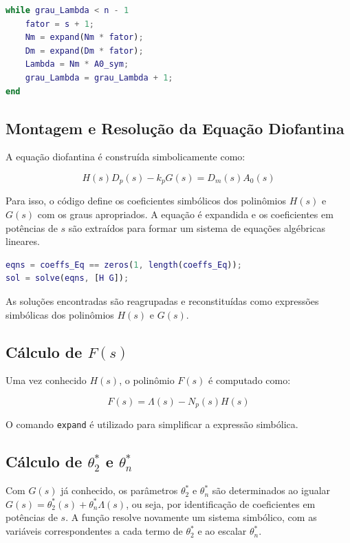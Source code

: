 \documentclass[10pt]{article}
\begin{document}
\begin{lstlisting}[language=Matlab]
while grau_Lambda < n - 1
    fator = s + 1;
    Nm = expand(Nm * fator);
    Dm = expand(Dm * fator);
    Lambda = Nm * A0_sym;
    grau_Lambda = grau_Lambda + 1;
end
\end{lstlisting}

\subsection{Montagem e Resolução da Equação Diofantina}

A equação diofantina é construída simbolicamente como:

\[
H(s) D_p(s) - k_p G(s) = D_m(s) A_0(s)
\]

Para isso, o código define os coeficientes simbólicos dos polinômios \( H(s) \) e \( G(s) \) com os graus apropriados. A equação é expandida e os coeficientes em potências de \( s \) são extraídos para formar um sistema de equações algébricas lineares.

\begin{lstlisting}[language=Matlab]
eqns = coeffs_Eq == zeros(1, length(coeffs_Eq));
sol = solve(eqns, [H G]);
\end{lstlisting}

As soluções encontradas são reagrupadas e reconstituídas como expressões simbólicas dos polinômios \( H(s) \) e \( G(s) \).

\subsection{Cálculo de \( F(s) \)}

Uma vez conhecido \( H(s) \), o polinômio \( F(s) \) é computado como:

\[
F(s) = \Lambda(s) - N_p(s) H(s)
\]

O comando \texttt{expand} é utilizado para simplificar a expressão simbólica.

\subsection{Cálculo de \(\theta_2^*\) e \(\theta_n^*\)}

Com \( G(s) \) já conhecido, os parâmetros \( \theta_2^* \) e \( \theta_n^* \) são determinados ao igualar \( G(s) = \theta_2^*(s) + \theta_n^* \Lambda(s) \), ou seja, por identificação de coeficientes em potências de \( s \). A função resolve novamente um sistema simbólico, com as variáveis correspondentes a cada termo de \( \theta_2^* \) e ao escalar \( \theta_n^* \).
\end{document}
